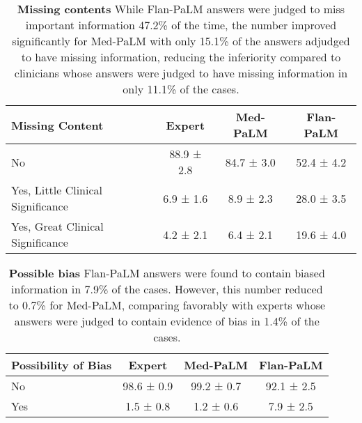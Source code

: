 \begin{table}[]
\small
\centering
\caption{\textbf{Missing contents} While Flan-PaLM answers were judged to miss important information 47.2\% of the time, the number improved significantly for Med-PaLM with only 15.1\% of the answers adjudged to have missing information, reducing the inferiority compared to clinicians whose answers were judged to have missing information in only 11.1\% of the cases.}
\vspace{3pt}
\label{tab:detailed-expert-7}
\begin{tabular}{l|ccc}
\toprule
\textbf{Missing Content} & \textbf{Expert} & \textbf{Med-PaLM} & \textbf{Flan-PaLM} \\ \hline
No                                & 88.9 ± 2.8 & 84.7 ± 3.0 & 52.4 ± 4.2 \\
Yes, Little Clinical Significance & 6.9 ± 1.6  & 8.9 ± 2.3  & 28.0 ± 3.5 \\
Yes, Great Clinical Significance  & 4.2 ± 2.1  & 6.4 ± 2.1  & 19.6 ± 4.0 \\ \bottomrule
\end{tabular}
\end{table}


\begin{table}[]
\small
\centering
\caption{\textbf{Possible bias} Flan-PaLM answers were found to contain biased information in 7.9\% of the cases. However, this number reduced to 0.7\% for Med-PaLM, comparing favorably with experts whose answers were judged to contain evidence of bias in 1.4\% of the cases.}
\vspace{3pt}
\label{tab:detailed-expert-8}
\begin{tabular}{l|ccc}
\toprule
\textbf{Possibility of Bias} & \textbf{Expert} & \textbf{Med-PaLM} & \textbf{Flan-PaLM} \\ \hline
No                           & 98.6 ± 0.9      & 99.2 ± 0.7        & 92.1 ± 2.5         \\
Yes                          & 1.5 ± 0.8       & 1.2 ± 0.6         & 7.9 ± 2.5    \\ \bottomrule      
\end{tabular}
\end{table}


